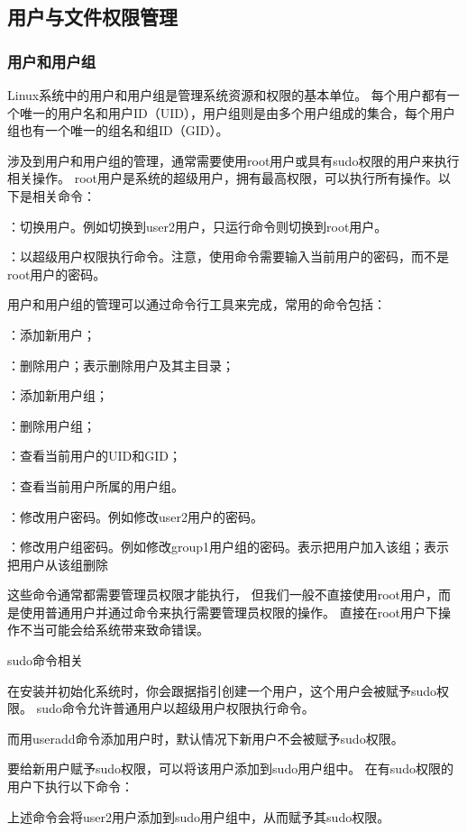 \subsection{用户与文件权限管理}
\subsubsection{用户和用户组}
Linux系统中的用户和用户组是管理系统资源和权限的基本单位。
每个用户都有一个唯一的用户名和用户ID（UID），用户组则是由多个用户组成的集合，每个用户组也有一个唯一的组名和组ID（GID）。

涉及到用户和用户组的管理，通常需要使用root用户或具有sudo权限的用户来执行相关操作。
root用户是系统的超级用户，拥有最高权限，可以执行所有操作。以下是相关命令：

：切换用户。例如切换到user2用户，只运行命令则切换到root用户。

：以超级用户权限执行命令。注意，使用命令需要输入当前用户的密码，而不是root用户的密码。

用户和用户组的管理可以通过命令行工具来完成，常用的命令包括：

：添加新用户；

：删除用户；表示删除用户及其主目录；

：添加新用户组；

：删除用户组；

：查看当前用户的UID和GID；

：查看当前用户所属的用户组。

：修改用户密码。例如修改user2用户的密码。

：修改用户组密码。例如修改group1用户组的密码。表示把用户加入该组；表示把用户从该组删除

这些命令通常都需要管理员权限才能执行，
但我们一般不直接使用root用户，而是使用普通用户并通过命令来执行需要管理员权限的操作。
直接在root用户下操作不当可能会给系统带来致命错误。

\begin{zy}
sudo命令相关

在安装并初始化系统时，你会跟据指引创建一个用户，这个用户会被赋予sudo权限。
sudo命令允许普通用户以超级用户权限执行命令。

而用useradd命令添加用户时，默认情况下新用户不会被赋予sudo权限。

要给新用户赋予sudo权限，可以将该用户添加到sudo用户组中。
在有sudo权限的用户下执行以下命令：
上述命令会将user2用户添加到sudo用户组中，从而赋予其sudo权限。
\end{zy}


